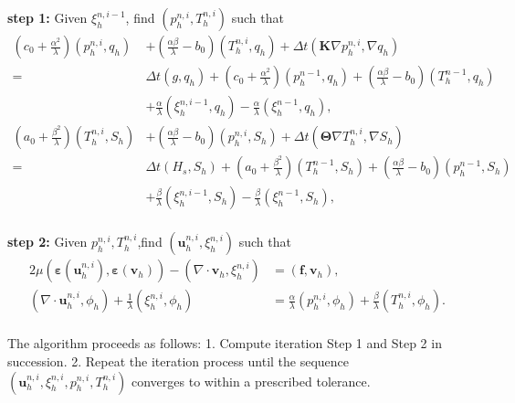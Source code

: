 \documentclass{article}
\numberwithin{equation}{section}
\begin{document}
\textbf{step 1:} Given $\xi_h^{n,i-1}$, find $(p_h^{n,i},T_h^{n,i})$ such that 
\begin{equation}\label{TP_Model_Ts_N1} 
  \begin{aligned}  
       (c_0  + \frac{\alpha^2}{\lambda})(p_{h}^{n,i},q_h) 
            &   + (\frac{\alpha\beta}{\lambda}-b_0)(T_{h}^{n,i},q_h) 
                + \Delta t(\bm K\nabla p^{n,i}_h,\nabla q_h)
                  \\
                =&   \Delta t(g,q_h)  
     +(c_0+\frac{\alpha^2}{\lambda})(p_{h}^{n-1},q_h) 
                + (\frac{\alpha\beta}{\lambda}-b_0)(T_{h}^{n-1},q_h) \\
            &   +  \frac\alpha\lambda(\xi_{h}^{n,i-1},q_h)
                -  \frac\alpha\lambda(\xi_{h}^{n-1},q_h)         ,\\
      (a_0    + \frac{\beta^2}{\lambda})(T_h^{n,i},S_h)
            & +(\frac{\alpha\beta}{\lambda}-b_0)(p_h^{n,i},S_h) 
               +\Delta t(\bm\Theta\nabla T^{n,i}_h,\nabla S_h)\\ 
               =&  \Delta t( H_{s},S_h)                            
    +(a_0    +\frac{\beta^2}{\lambda})(T_h^{n-1},S_h)
               +(\frac{\alpha\beta}{\lambda}-b_0)(p_h^{n-1},S_h)  \\
            & +\frac\beta\lambda(\xi_h^{n,i-1},S_h)
               -  \frac\beta\lambda(\xi_{h}^{n-1},S_h),\\
\end{aligned}  
\end{equation}
  
 \textbf{step 2:} Given $p_h^{n,i},T_h^{n,i}$,find $(\bm u_h^{n,i},\xi_h^{n,i})$ such that 
\begin{equation}\label{TP_Model_uxi_N1} 
\begin{aligned}  
    2\mu(\bm\varepsilon(\bm u^{n,i}_h), \bm\varepsilon(\bm v_h))
  - (\nabla\cdot\bm v_h,\xi^{n,i}_h) 
                &=(\bm f,\bm v_h),\\
   (\nabla\cdot\bm u^{n,i}_h,\phi_h)+\frac{1}{\lambda}(\xi^{n,i}_h,\phi_h)   
                &=  \frac{\alpha}{\lambda}(p^{n,i}_h,\phi_h)+\frac{\beta}{\lambda}(T^{n,i}_h,\phi_h). \\ 
\end{aligned}
\end{equation}

The algorithm proceeds as follows:
1. Compute iteration Step 1 and Step 2 in succession.
2. Repeat the iteration process until the sequence \((\bm{u}_h^{n,i}, \xi_h^{n,i}, p_h^{n,i}, T_h^{n,i})\) converges to within a prescribed tolerance.
\end{document}
